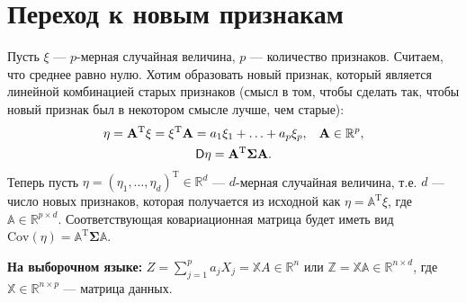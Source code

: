 \documentclass[specialist, 12pt,
subf, %
href, colorlinks=true,
substylefile = spbu.rtx,
]{disser}
\begin{document}
\section{Переход к новым признакам}
Пусть $\xi$ --- $p$-мерная случайная величина, $p$ --- количество признаков. Считаем, что среднее равно нулю. Хотим образовать новый признак, который является линейной комбинацией старых признаков (смысл в том, чтобы сделать так, чтобы новый признак был в некотором смысле лучше, чем старые):
\begin{gather*}
\eta = \mathbf{A}^{\mathrm{T}}\xi = \xi^{\mathrm{T}} \mathbf{A} = a_1 \xi_1 + \ldots + a_p \xi_p, \hspace{0.3 cm} \mathbf{A} \in \mathbb{R}^p,\\
\textsf{D}\eta = \mathbf{A}^{\mathrm{T}} \mathbf{\bm\Sigma} \mathbf{A}.
\end{gather*}
Теперь пусть $\eta = (\eta_1, \ldots, \eta_d)^{\mathrm{T}} \in \mathbb{R}^d$ --- $d$-мерная случайная величина, т.е. $d$ --- число новых признаков, которая получается из исходной как $\eta = \mathbb{A}^{\mathrm{T}} \xi$, где $\mathbb{A} \in \mathbb{R}^{p\times d}$. Соответствующая ковариационная матрица будет иметь вид $\mathrm{Cov} (\eta) = \mathbb{A}^{\mathrm{T}} \mathbf{\bm\Sigma} \mathbb{A}$.

\textbf{На выборочном языке:} $Z = \sum\limits_{j = 1}^{p} a_j X_j = \mathbb{X} A \in \mathbb{R}^n$ или $\mathbb{Z} = \mathbb{X} \mathbb{A} \in \mathbb{R}^{n \times d}$, где $\mathbb{X} \in \mathbb{R}^{n \times p}$ --- матрица данных.
\\
\end{document}
